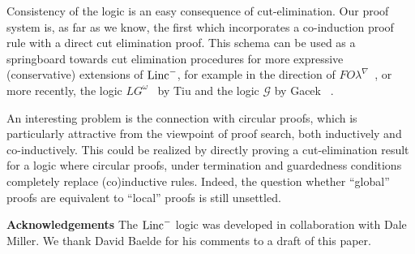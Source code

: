 \documentclass[preprint]{elsarticle}
\def\Gscr{{\mathcal G}}
\newcommand{\FOL   }{FO\lambda}
\newcommand{\FOLNb }{\FOL^{\nabla}}
\newcommand{\Linc}{{\rm Linc}^-}
\begin{document}
Consistency of the logic is an easy consequence of cut-elimination.
Our proof system is, as far as we know, the first which incorporates a
co-induction proof rule with a direct cut elimination proof. This
schema can be used as a springboard towards cut elimination procedures
for more expressive (conservative) extensions of $\Linc$, for example
in the direction of $\FOLNb$~\cite{miller05tocl}, or more recently,
the logic $LG^\omega$~\cite{Tiu07} by Tiu and the logic $\Gscr$ by
Gacek \etal~\cite{gacek08lics}.








An interesting problem is the connection with circular
proofs, which is particularly attractive from the viewpoint of
proof search, both inductively and co-inductively. This could be
realized by directly proving a cut-elimination result for a logic
where circular proofs, under termination and guardedness conditions
completely replace (co)inductive rules. Indeed, the question whether
``global'' proofs are equivalent to ``local'' proofs
\cite{BrotherstonS07} is still unsettled.


\medskip

\textbf{Acknowledgements} The $\Linc$ logic was developed in
collaboration with Dale Miller. We thank David Baelde for his comments
to a draft of this paper. 
\end{document}
